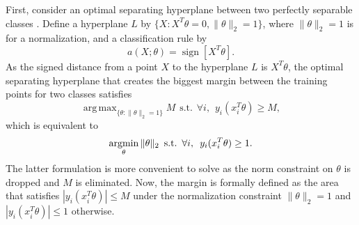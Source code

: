 \documentclass[12pt]{article}
\DeclareMathOperator*{\sign}{sign}
\DeclareMathOperator*{\argmax}{arg\,max}
\newcommand{\argmin}{\mathop{\rm argmin}\limits}
\begin{document}
First, consider an optimal separating hyperplane between two perfectly separable classes \parencite{Rosenblatt1958}. Define a hyperplane $L$ by $\{X : X^T \theta = 0, \|\theta\|_2 = 1\}$, where $\|\theta\|_2 = 1$ is for a normalization, and a classification rule by
\begin{equation*}
a(X;\theta) = \sign[X^T \theta].
\end{equation*}
As the signed distance from a point $X$ to the hyperplane $L$ is $X^T \theta$, the optimal separating hyperplane that creates the biggest margin between the training points for two classes satisfies
\begin{equation*}
\argmax_{\{\theta: \|\theta\|_2 = 1\}} M \hspace{5pt} \text{s.t.} \hspace{5pt} \forall i, \hspace{5pt} y_i (x_i^T \theta) \geq M,
\end{equation*}
which is equivalent to
\begin{equation*}
\argmin_{\theta} \|\theta\|_2 \hspace{5pt} \text{s.t.} \hspace{5pt} \forall i, \hspace{5pt} y_i (x_i^T \theta) \geq 1.
\end{equation*}
The latter formulation is more convenient to solve as the norm constraint on $\theta$ is dropped and $M$ is eliminated. Now, the margin is formally defined as the area that satisfies $|y_i (x_i^T \theta)| \leq M$ under the normalization constraint $\|\theta\|_2 = 1$ and $|y_i (x_i^T \theta)| \leq 1$ otherwise.
\end{document}
